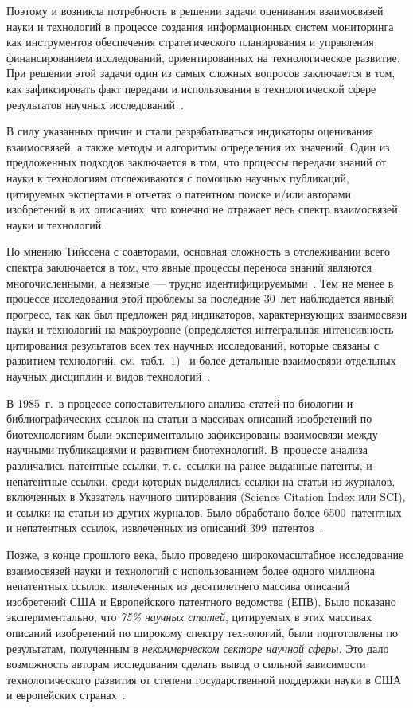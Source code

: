 \begin{multicols}{2}
    Поэтому и возникла потребность в решении задачи оценивания взаимосвязей науки и 
технологий в процессе создания информационных систем мониторинга как инструментов 
обеспечения стратегического планирования и управления финансированием исследований, 
ориентированных на технологическое развитие. При решении этой задачи один из самых 
сложных вопросов заключается в том, как зафиксировать факт передачи и использования в 
технологической сфере результатов научных исследований~\cite{35-zat}.
  
  В силу указанных причин и стали разрабатываться индикаторы оценивания взаимосвязей, а 
также методы и алгоритмы определения их значений. Один из предложенных подходов 
заключается в том, что процессы передачи знаний от науки к технологиям отслеживаются с 
помощью научных публикаций, цитируемых экспертами в отчетах о патентном поиске и/или 
авторами изобретений в их описаниях, что конечно не отражает весь спектр взаимосвязей науки 
и технологий.
    
    По мнению Тийссена с соавторами, основная сложность в отслеживании всего спектра заключается в 
том, что явные процессы переноса знаний являются многочисленными, а неявные~--- трудно 
идентифицируемыми~\cite{37-zat}. Тем не менее в процессе исследования этой проблемы за 
последние 30~лет наблюдается явный прогресс, так как был предложен ряд индикаторов, 
характеризующих взаимосвязи науки и технологий на макроуровне (определяется интегральная 
интенсивность цитирования результатов всех тех научных исследований, которые связаны с 
развитием технологий, см.\ табл.~1)~\cite{38-zat} и более детальные взаимосвязи отдельных 
научных дис\-цип\-лин и видов технологий~\cite{39-zat}.
    
    В 1985~г.\ в процессе сопоставительного анализа статей по биологии и библиографических 
ссылок на статьи в массивах описаний изобретений по биотехнологиям были экспериментально 
зафиксированы взаимосвязи между научными публикациями и развитием биотехнологий. 
В~процессе анализа различались патентные ссылки, т.\,е.\ ссылки на ранее выданные патенты, 
и непатентные ссылки, среди которых выделялись ссылки на статьи из журналов, включенных 
в Указатель научного цитирования (Science Citation Index или SCI), и ссылки на статьи из 
других журналов. Было обработано более 6500~патентных и непатентных ссылок, извлеченных 
из описаний 399~патентов~\cite{39-zat}.
    
    Позже, в конце прошлого века, было проведено широкомасштабное исследование 
взаимосвязей науки и технологий с использованием более одного миллиона непатентных 
ссылок, извлеченных из десятилетнего массива описаний изобретений США и Европейского 
патентного ведомства (ЕПВ). Было показано экспериментально, что \textit{75\% научных 
статей}, цитируемых в этих массивах описаний изо\-бре\-те\-ний по широкому спектру 
технологий, были подготовлены по результатам, полученным в \textit{не\-ком\-мер\-че\-ском секторе 
научной сферы}. Это дало возможность авторам исследования сделать вывод о сильной 
зависимости технологического развития от степени государственной поддержки науки в США 
и европейских странах~\cite{40-zat}.
    

\end{multicols}
